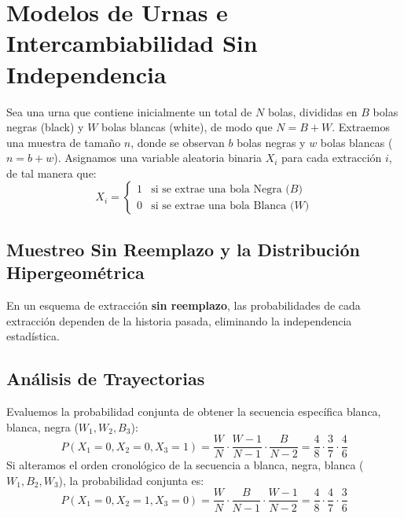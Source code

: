 \section{Modelos de Urnas e Intercambiabilidad Sin Independencia}

Sea una urna que contiene inicialmente un total de $N$ bolas, divididas en $B$ bolas negras (black) y $W$ bolas blancas (white), de modo que $N = B + W$. Extraemos una muestra de tamaño $n$, donde se observan $b$ bolas negras y $w$ bolas blancas ($n = b + w$).
\noindent
Asignamos una variable aleatoria binaria $X_i$ para cada extracción $i$, de tal manera que:
\begin{equation}
    X_i = \begin{cases} 1 & \text{si se extrae una bola Negra ($B$)} \\ 0 & \text{si se extrae una bola Blanca ($W$)} \end{cases}
\end{equation}

\subsection{Muestreo Sin Reemplazo y la Distribución Hipergeométrica}

En un esquema de extracción \textbf{sin reemplazo}, las probabilidades de cada extracción dependen de la historia pasada, eliminando la independencia estadística. 

\subsection*{Análisis de Trayectorias}
Evaluemos la probabilidad conjunta de obtener la secuencia específica blanca, blanca, negra ($W_1, W_2, B_3$):
\begin{equation}
    P(X_1 = 0, X_2 = 0, X_3 = 1) = \frac{W}{N} \cdot \frac{W-1}{N-1} \cdot \frac{B}{N-2} = \frac{4}{8} \cdot \frac{3}{7} \cdot \frac{4}{6}
\end{equation}
Si alteramos el orden cronológico de la secuencia a blanca, negra, blanca ($W_1, B_2, W_3$), la probabilidad conjunta es:
\begin{equation}
    P(X_1 = 0, X_2 = 1, X_3 = 0) = \frac{W}{N} \cdot \frac{B}{N-1} \cdot \frac{W-1}{N-2} = \frac{4}{8} \cdot \frac{4}{7} \cdot \frac{3}{6}
\end{equation}


